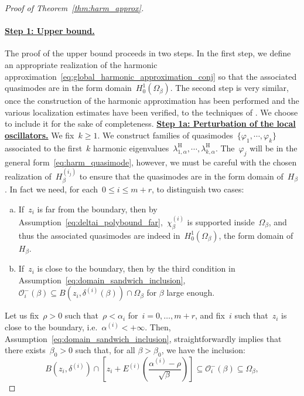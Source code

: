 \documentclass[10pt]{article}
\newcommand{\1}{\mathbbm 1}
\newcommand{\deltaRadius}[1]{\delta^{(#1)}} %
\newcommand{\epsLimit}[1]{\alpha^{(#1)}} %
\newcommand{\localNeighborhood}[2][]{\mathcal{O}_{#2}^{#1}} %
\newcommand{\halfSpace}[1]{E^{(#1)}}
\newcommand{\shift}{\rho} %
\begin{document}
\begin{proof}[Proof of Theorem~\ref{thm:harm_approx}]
        \paragraph{\underline{Step 1: Upper bound.}}
        The proof of the upper bound proceeds in two steps. In the first step, we define an appropriate realization of the harmonic approximation~\eqref{eq:global_harmonic_approximation_conj} so that the associated quasimodes are in the form domain~$H_0^1(\Omega_\beta)$. The second step is very similar, once the construction of the harmonic approximation has been performed and the various localization estimates have been verified, to the techniques of \cite{S83,CFKS87}. We choose to include it for the sake of completeness.  
        {\underline{\bf Step 1a: Perturbation of the local oscillators.}\newline}
        We fix~$k\geq 1$. We construct families of quasimodes~$\{\varphi_1,\dotsm,\varphi_k\}$ associated to the first~$k$ harmonic eigenvalues~$\lambda_{1,\alpha}^{\mathrm H},\dotsm,\lambda_{k,\alpha}^{\mathrm H}$.
        The~$\varphi_{j}$ will be in the general form~\eqref{eq:harm_quasimode}, however, we must be careful with the chosen realization of~$H_\beta^{(i_j)}$ to ensure that the quasimodes are in the form domain of~$H_\beta$.
        In fact we need, for each~$0\leq i\leq m+r$, to distinguish two cases:
        \begin{enumerate}[a)]
            \item{If~$z_i$ is far from the boundary, then by Assumption~\eqref{eq:deltai_polybound_far},~$\chi_\beta^{(i)}$ is supported inside~$\Omega_\beta$, and thus the associated quasimodes are indeed in~$H_0^1(\Omega_\beta)$, the form domain of~$H_\beta$.}
            \item{If~$z_i$ is close to the boundary, then by the third condition in Assumption~\eqref{eq:domain_sandwich_inclusion},~$\localNeighborhood[-]{i}(\beta)\subseteq B(z_i,\deltaRadius{i}(\beta)) \cap \Omega_\beta$ for $\beta$ large enough.}
        \end{enumerate}
        Let us fix~$\shift>0$ such that~$\shift<\alpha_i$ for~$i=0,\dots,m+r$, and fix~$i$ such that~$z_i$ is close to the boundary, i.e.~$\epsLimit{i}<+\infty$. Then, Assumption~\eqref{eq:domain_sandwich_inclusion}, straightforwardly implies that there exists~$\beta_0>0$ such that, for all $\beta>\beta_0$, we have the inclusion:
        \[B(z_i,\deltaRadius{i})\cap \left[z_i + \halfSpace{i}\left(\frac{\epsLimit{i}-\shift}{\sqrt\beta}\right)\right]\subseteq \localNeighborhood[-]{i}(\beta) \subseteq \Omega_\beta,\]

\end{proof}
\end{document}
